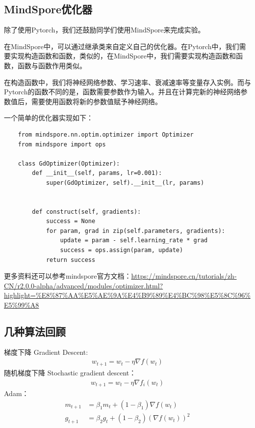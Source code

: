\subsection{MindSpore优化器}

除了使用Pytorch，我们还鼓励同学们使用MindSpore来完成实验。

在MindSpore中，可以通过继承类来自定义自己的优化器。在Pytorch中，我们需要实现构造函数和函数，类似的，在MindSpore中，我们需要实现构造函数和函数，函数与函数作用类似。

在构造函数中，我们将神经网络参数、学习速率、衰减速率等变量存入实例。而与Pytorch的函数不同的是，函数需要参数作为输入。并且在计算完新的神经网络参数值后，需要使用函数将新的参数值赋予神经网络。

一个简单的优化器实现如下：
\begin{lstlisting}
    from mindspore.nn.optim.optimizer import Optimizer
    from mindspore import ops

    class GdOptimizer(Optimizer):
        def __init__(self, params, lr=0.001):
            super(GdOptimizer, self).__init__(lr, params)

        
        def construct(self, gradients):
            success = None
            for param, grad in zip(self.parameters, gradients):
                update = param - self.learning_rate * grad
                success = ops.assign(param, update)
            return success
\end{lstlisting}

更多资料还可以参考mindspore官方文档：\url{https://mindspore.cn/tutorials/zh-CN/r2.0.0-alpha/advanced/modules/optimizer.html?highlight=%E8%87%AA%E5%AE%9A%E4%B9%89%E4%BC%98%E5%8C%96%E5%99%A8}

\subsection{几种算法回顾}

梯度下降 Gradient Descent:
\begin{align} 
w_{t+1} = w_t - \eta \nabla f(w_t)
\end{align}
随机梯度下降 Stochastic gradient descent：
\begin{align} 
w_{t+1} = w_t - \eta \nabla f_i(w_t)
\end{align}
Adam：
\begin{align} %
    m_{t+1} & = \beta_1 m_t + (1-\beta_1) \nabla f(w_t)   \\
    g_{t+1} & = \beta_2 g_t + (1-\beta_2) (\nabla f(w_t))^2
\end{align}


